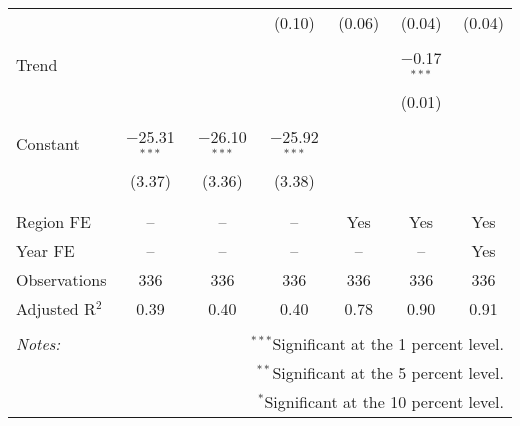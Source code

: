 \documentclass[10pt]{article}
\begin{document}
\begin{table}[!htbp]
\begin{tabular}{@{\extracolsep{5pt}}lcccccc}
  &  &  & (0.10) & (0.06) & (0.04) & (0.04) \\ 
  & & & & & & \\ 
 Trend &  &  &  &  & $-$0.17$^{***}$ &  \\ 
  &  &  &  &  & (0.01) &  \\ 
  & & & & & & \\ 
 Constant & $-$25.31$^{***}$ & $-$26.10$^{***}$ & $-$25.92$^{***}$ &  &  &  \\ 
  & (3.37) & (3.36) & (3.38) &  &  &  \\ 
  & & & & & & \\ 
\hline \\[-1.8ex] 
Region FE & -- & -- & -- & Yes & Yes & Yes \\ 
Year FE & -- & -- & -- & -- & -- & Yes \\ 
Observations & 336 & 336 & 336 & 336 & 336 & 336 \\ 
Adjusted R$^{2}$ & 0.39 & 0.40 & 0.40 & 0.78 & 0.90 & 0.91 \\ 
\hline 
\hline \\[-1.8ex] 
\textit{Notes:} & \multicolumn{6}{r}{$^{***}$Significant at the 1 percent level.} \\ 
 & \multicolumn{6}{r}{$^{**}$Significant at the 5 percent level.} \\ 
 & \multicolumn{6}{r}{$^{*}$Significant at the 10 percent level.} \\ 
\end{tabular} 
\end{table} 
\end{document}
